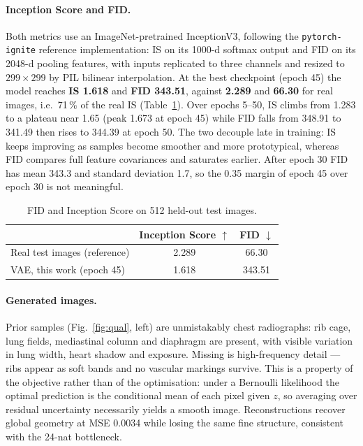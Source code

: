 \documentclass{article}
\begin{document}
\paragraph{Inception Score and FID.} Both metrics use an ImageNet-pretrained InceptionV3, following
the \texttt{pytorch-ignite} reference implementation: IS on its 1000-d softmax output and FID on its
2048-d pooling features, with inputs replicated to three channels and resized to $299\times299$ by
PIL bilinear interpolation. At the best checkpoint (epoch 45) the model reaches
\textbf{IS 1.618} and \textbf{FID 343.51}, against \textbf{2.289} and \textbf{66.30} for real images,
i.e.\ 71\,\% of the real IS (Table~\ref{tab:metrics}). Over epochs 5--50, IS climbs from 1.283 to a
plateau near 1.65 (peak 1.673 at epoch 45) while FID falls from 348.91 to 341.49 then rises to 344.39
at epoch 50. The two decouple late in training: IS keeps improving as samples become smoother and
more prototypical, whereas FID compares full feature covariances and saturates earlier. After epoch
30 FID has mean 343.3 and standard deviation 1.7, so the 0.35 margin of epoch 45 over epoch 30 is not
meaningful.

\begin{table}[H]
\centering
\small
\caption{FID and Inception Score on 512 held-out test images.}
\label{tab:metrics}
\begin{tabular}{@{}lcc@{}}
\toprule
 & Inception Score $\uparrow$ & FID $\downarrow$ \\
\midrule
Real test images (reference) & 2.289 & 66.30 \\
VAE, this work (epoch 45)    & 1.618 & 343.51 \\
\bottomrule
\end{tabular}
\end{table}

\paragraph{Generated images.} Prior samples (Fig.~\ref{fig:qual}, left) are unmistakably chest
radiographs: rib cage, lung fields, mediastinal column and diaphragm are present, with visible
variation in lung width, heart shadow and exposure. Missing is high-frequency detail --- ribs appear
as soft bands and no vascular markings survive. This is a property of the objective rather than of
the optimisation: under a Bernoulli likelihood the optimal prediction is the conditional mean of
each pixel given $z$, so averaging over residual uncertainty necessarily yields a smooth image.
Reconstructions recover global geometry at MSE 0.0034 while losing the same fine structure,
consistent with the 24-nat bottleneck.
\end{document}
